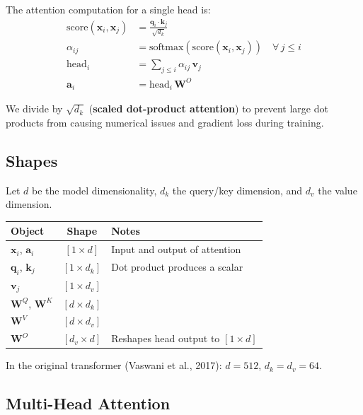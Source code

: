 \documentclass[main.tex]{subfiles}
\begin{document}
The attention computation for a single head is:
\begin{align}
\text{score}(\mathbf{x}_i, \mathbf{x}_j) &= \frac{\mathbf{q}_i \cdot \mathbf{k}_j}{\sqrt{d_k}} \tag{8.11} \\[6pt]
\alpha_{ij} &= \text{softmax}\left(\text{score}(\mathbf{x}_i, \mathbf{x}_j)\right) \quad \forall\, j \leq i \tag{8.12} \\[6pt]
\text{head}_i &= \sum_{j \leq i} \alpha_{ij} \, \mathbf{v}_j \tag{8.13} \\[6pt]
\mathbf{a}_i &= \text{head}_i \, \mathbf{W}^O \tag{8.14}
\end{align}

\begin{remark}
We divide by $\sqrt{d_k}$ (\textbf{scaled dot-product attention}) to prevent large dot products from causing numerical issues and gradient loss during training.
\end{remark}

\subsection{Shapes}

Let $d$ be the model dimensionality, $d_k$ the query/key dimension, and $d_v$ the value dimension.

\begin{center}
\begin{tabular}{l c l}
\textbf{Object} & \textbf{Shape} & \textbf{Notes} \\
\hline
$\mathbf{x}_i$, $\mathbf{a}_i$ & $[1 \times d]$ & Input and output of attention \\
$\mathbf{q}_i$, $\mathbf{k}_j$ & $[1 \times d_k]$ & Dot product produces a scalar \\
$\mathbf{v}_j$ & $[1 \times d_v]$ & \\
$\mathbf{W}^Q$, $\mathbf{W}^K$ & $[d \times d_k]$ & \\
$\mathbf{W}^V$ & $[d \times d_v]$ & \\
$\mathbf{W}^O$ & $[d_v \times d]$ & Reshapes head output to $[1 \times d]$ \\
\end{tabular}
\end{center}

In the original transformer (Vaswani et al., 2017): $d = 512$, $d_k = d_v = 64$.

\subsection{Multi-Head Attention}
\end{document}
